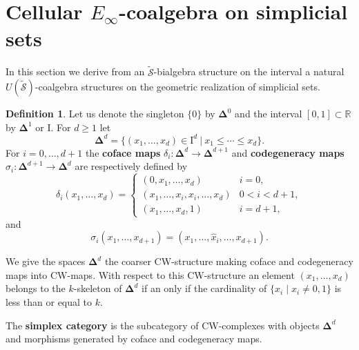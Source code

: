 \documentclass{amsart}
\renewcommand{\S}{\mathcal{S}}
\newcommand{\I}{\mathrm{I}}
\newcommand{\R}{\mathbb{R}}
\newcommand{\simplex}{\bm{\Delta}}
\renewcommand{\1}{\mathbf{1}}
\theoremstyle{definition}
\newtheorem{definition}[theorem]{Definition}
\begin{document}
\section{Cellular $E_\infty$-coalgebra on simplicial sets}

In this section we derive from an $\tilde{\S}$-bialgebra structure on the interval a natural \mbox{$U(\tilde{\S})$-coalgebra} structures on the geometric realization of simplicial sets.

\begin{definition} \label{definition: simplex category}
	Let us denote the singleton $\{0\}$ by $\simplex^0$ and the interval $[0,1] \subset \R$ by $\simplex^1$ or $\I$. For $d \geq 1$ let  
	\begin{equation*}
	\simplex^d = \big\{ (x_1, \dots, x_d) \in \I^d\ | \ x_1 \leq \cdots \leq x_d \}.
	\end{equation*}
	For $i = 0,\dots,d+1$ the \textbf{coface maps} $\delta_i:\simplex^{d} \to \simplex^{d+1}$ and \textbf{codegeneracy maps} $\sigma_i : \simplex^{d+1} \to \simplex^{d}$ are respectively defined by
	\begin{equation*}
	\delta_i(x_1, \dots, x_d) = 
	\begin{cases}
	(0,x_1, \dots, x_d)    & i = 0, \\
	(x_1, \dots, x_i, x_i, \dots, x_d)    & 0 < i < d+1, \\
	(x_1, \dots, x_d, 1)    & i = d+1,
	\end{cases}
	\end{equation*}
	and
	\begin{equation*}
	\sigma_i(x_1, \dots, x_{d+1}) = (x_1, \dots, \widehat{x}_i, \dots, x_{d+1}).
	\end{equation*}
	
	We give the spaces $\simplex^d$ the coarser CW-structure making coface and codegeneracy maps into CW-maps. With respect to this CW-structure an element $(x_1,\dots,x_d)$ belongs to the $k$-skeleton of $\simplex^d$ if an only if the cardinality of $\{x_i\; |\; x_i \neq 0,1\}$ is less than or equal to $k$.
	
	The \textbf{simplex category} is the subcategory of CW-complexes with objects $\simplex^d$ and morphisms generated by coface and codegeneracy maps.
\end{definition}
\end{document}
